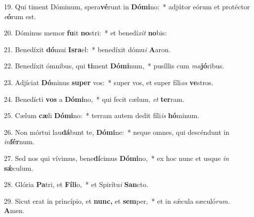 \item 19. Qui timent Dóminum, spera\textbf{vé}runt in \textbf{Dó}\textbf{mi}no:~* adjútor eórum et protéctor \textit{e}\textbf{ó}rum est.
\item 20. Dóminus memor \textbf{fu}it \textbf{no}stri:~* et benedí\textit{xit} \textbf{no}bis:
\item 21. Benedíxit \textbf{dó}mui \textbf{Is}\textbf{ra}el:~* benedíxit dómu\textit{i} \textbf{A}aron.
\item 22. Benedíxit ómnibus, qui \textbf{ti}ment \textbf{Dó}\textbf{mi}num,~* pusíllis cum \textit{ma}\textbf{jó}ribus.
\item 23. Adjíciat \textbf{Dó}minus \textbf{su}\textbf{per} vos:~* super vos, et super fíli\textit{os} \textbf{ve}stros.
\item 24. Benedícti \textbf{vos} a \textbf{Dó}\textbf{mi}no,~* qui fecit cælum, \textit{et} \textbf{ter}ram.
\item 25. Cælum \textbf{cæ}li \textbf{Dó}\textbf{mi}no:~* terram autem dedit fíli\textit{is} \textbf{hó}minum.
\item 26. Non mórtui lau\textbf{dá}bunt te, \textbf{Dó}\textbf{mi}ne:~* neque omnes, qui descéndunt in \textit{in}\textbf{fér}num.
\item 27. Sed nos qui vívimus, bene\textbf{dí}cimus \textbf{Dó}\textbf{mi}no,~* ex hoc nunc et usque \textit{in} \textbf{sǽ}culum.
\item 28. Glória \textbf{Pa}tri, et \textbf{Fí}\textbf{li}o,~* et Spirítu\hspace{0.03em}\textit{i} \textbf{San}cto.
\item 29. Sicut erat in princípio, et \textbf{nunc,} et \textbf{sem}per,~* et in sǽcula sæculó\textit{rum.} \textbf{A}men.
